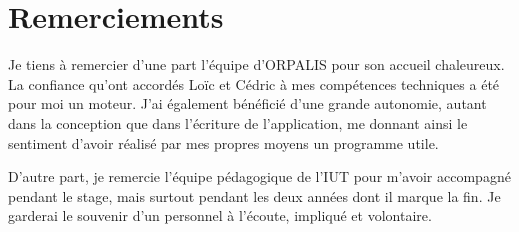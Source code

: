 \chapter*{Remerciements}

Je tiens à remercier d'une part l'équipe d'ORPALIS pour son accueil chaleureux. La confiance qu'ont accordés Loïc et Cédric à mes compétences techniques a été pour moi un moteur. J'ai également bénéficié d'une grande autonomie, autant dans la conception que dans l'écriture de l'application, me donnant ainsi le sentiment d'avoir réalisé par mes propres moyens un programme utile.

D'autre part, je remercie l'équipe pédagogique de l'IUT pour m'avoir accompagné pendant le stage, mais surtout pendant les deux années dont il marque la fin. Je garderai le souvenir d'un personnel à l'écoute, impliqué et volontaire.